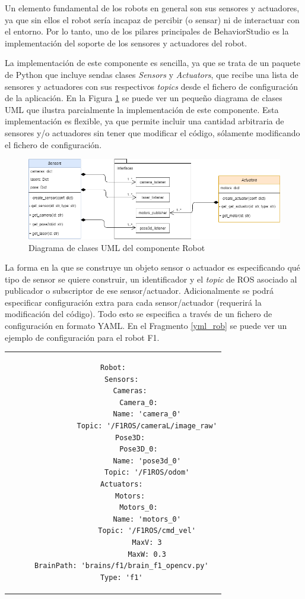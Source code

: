 Un elemento fundamental de los robots en general son sus sensores y actuadores, ya que sin ellos el robot sería incapaz de percibir (o sensar) ni de interactuar con el entorno. Por lo tanto, uno de los pilares principales de BehaviorStudio es la implementación del soporte de los sensores y actuadores del robot.

La implementación de este componente es sencilla, ya que se trata de un paquete de Python que incluye sendas clases \textit{Sensors} y \textit{Actuators}, que recibe una lista de sensores y actuadores con sus respectivos \textit{topics} desde el fichero de configuración de la aplicación. En la Figura \ref{fig:robouml} se puede ver un pequeño diagrama de clases UML que ilustra parcialmente la implementación de este componente. Esta implementación es flexible, ya que permite incluir una cantidad arbitraria de sensores y/o actuadores sin tener que modificar el código, sólamente modificando el fichero de configuración.

\begin{figure}
  \centering
  \includegraphics[width=1\linewidth]{img/robotuml}
  \caption{Diagrama de clases UML del componente Robot}
  \label{fig:robouml}
\end{figure}


La forma en la que se construye un objeto sensor o actuador es especificando qué tipo de sensor se quiere construir, un identificador y el \textit{topic} de ROS asociado al publicador o subscriptor de ese sensor/actuador. Adicionalmente se podrá especificar configuración extra para cada sensor/actuador (requerirá la modificación del código). Todo esto se especifica a través de un fichero de configuración en formato YAML. En el Fragmento \ref{yml_rob} se puede ver un ejemplo de configuración para el robot F1.

\begin{tabular}{c}
\begin{lstlisting}[caption={Ejemplo de configuración en formato YAML},label=yml_rob]
Robot:
    Sensors:
        Cameras:
            Camera_0:
                Name: 'camera_0'
                Topic: '/F1ROS/cameraL/image_raw'
        Pose3D:
            Pose3D_0:
                Name: 'pose3d_0'
                Topic: '/F1ROS/odom'
    Actuators:
        Motors:
            Motors_0:
                Name: 'motors_0'
                Topic: '/F1ROS/cmd_vel'
                MaxV: 3
                MaxW: 0.3
    BrainPath: 'brains/f1/brain_f1_opencv.py'
    Type: 'f1'
\end{lstlisting}
\end{tabular}

